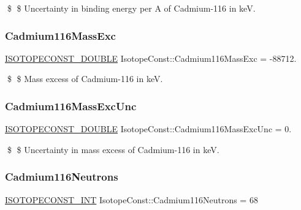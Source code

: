 \$ \$ Uncertainty in binding energy per A of Cadmium-\/116 in keV. \mbox{\label{group___isotope_const-_cadmium-_cd116_gaf352a6a25f2486ade85c3718349f1d13}} 
\subsubsection{\texorpdfstring{Cadmium116\+Mass\+Exc}{Cadmium116MassExc}}
{\footnotesize\ttfamily \mbox{\hyperlink{group___isotope_const-_macros_ga8f45a7272ce02c0b4c65c44636ed719a}{I\+S\+O\+T\+O\+P\+E\+C\+O\+N\+S\+T\+\_\+\+D\+O\+U\+B\+LE}} Isotope\+Const\+::\+Cadmium116\+Mass\+Exc = -\/88712.}

\$ \$ Mass excess of Cadmium-\/116 in keV. \mbox{\label{group___isotope_const-_cadmium-_cd116_ga1d8df3306224376efc6a314f177e30d8}} 
\subsubsection{\texorpdfstring{Cadmium116\+Mass\+Exc\+Unc}{Cadmium116MassExcUnc}}
{\footnotesize\ttfamily \mbox{\hyperlink{group___isotope_const-_macros_ga8f45a7272ce02c0b4c65c44636ed719a}{I\+S\+O\+T\+O\+P\+E\+C\+O\+N\+S\+T\+\_\+\+D\+O\+U\+B\+LE}} Isotope\+Const\+::\+Cadmium116\+Mass\+Exc\+Unc = 0.}

\$ \$ Uncertainty in mass excess of Cadmium-\/116 in keV. \mbox{\label{group___isotope_const-_cadmium-_cd116_gadd4fe12d4dc308a3c40198b739709547}} 
\subsubsection{\texorpdfstring{Cadmium116\+Neutrons}{Cadmium116Neutrons}}
{\footnotesize\ttfamily \mbox{\hyperlink{group___isotope_const-_macros_ga5f18360b3e99483a35c32d789e62621c}{I\+S\+O\+T\+O\+P\+E\+C\+O\+N\+S\+T\+\_\+\+I\+NT}} Isotope\+Const\+::\+Cadmium116\+Neutrons = 68}

